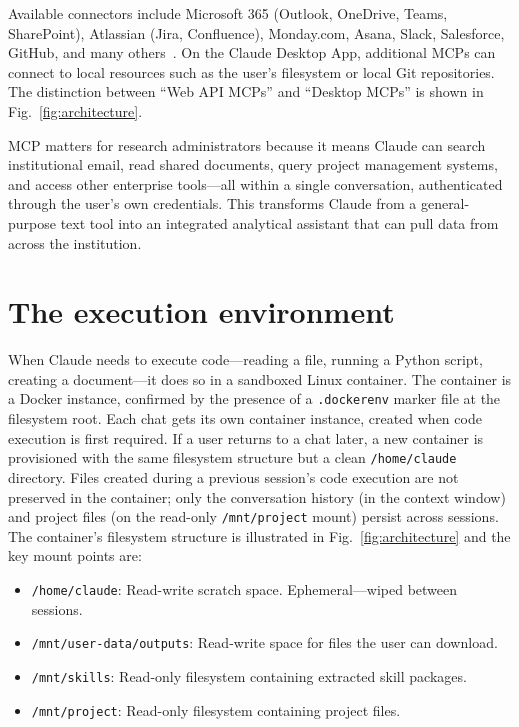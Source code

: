 \documentclass[12pt]{article}
\begin{document}
Available connectors include Microsoft 365 (Outlook, OneDrive, Teams, SharePoint), Atlassian (Jira, Confluence), Monday.com, Asana, Slack, Salesforce, GitHub, and many others~\cite{anthropic_integrations}. On the Claude Desktop App, additional MCPs can connect to local resources such as the user's filesystem or local Git repositories. The distinction between ``Web API MCPs'' and ``Desktop MCPs'' is shown in Fig.~\ref{fig:architecture}.

MCP matters for research administrators because it means Claude can search institutional email, read shared documents, query project management systems, and access other enterprise tools---all within a single conversation, authenticated through the user's own credentials. This transforms Claude from a general-purpose text tool into an integrated analytical assistant that can pull data from across the institution.

\section{The execution environment}
\label{sec:container}

When Claude needs to execute code---reading a file, running a Python script, creating a document---it does so in a sandboxed Linux container. The container is a Docker instance, confirmed by the presence of a \texttt{.dockerenv} marker file at the filesystem root. Each chat gets its own container instance, created when code execution is first required. If a user returns to a chat later, a new container is provisioned with the same filesystem structure but a clean \texttt{/home/claude} directory. Files created during a previous session's code execution are not preserved in the container; only the conversation history (in the context window) and project files (on the read-only \texttt{/mnt/project} mount) persist across sessions. The container's filesystem structure is illustrated in Fig.~\ref{fig:architecture} and the key mount points are:

\begin{itemize}
\item \texttt{/home/claude}: Read-write scratch space. Ephemeral---wiped between sessions.
\item \texttt{/mnt/user-data/outputs}: Read-write space for files the user can download.
\item \texttt{/mnt/skills}: Read-only filesystem containing extracted skill packages.
\item \texttt{/mnt/project}: Read-only filesystem containing project files.
\end{itemize}
\end{document}
